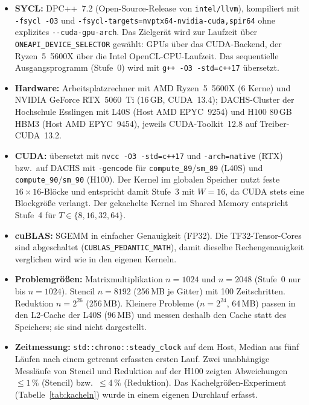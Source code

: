 \documentclass[12pt,a4paper]{article}
\begin{document}
\begin{itemize}[nosep]
    \item \textbf{SYCL:} DPC++~7.2 (Open-Source-Release von \texttt{intel/llvm}),
    kompiliert mit \texttt{-fsycl -O3} und
    \texttt{-fsycl-targets=\allowbreak nvptx64-\allowbreak nvidia-\allowbreak cuda,\allowbreak spir64}
    ohne explizites \texttt{-{}-cuda-\allowbreak gpu-\allowbreak arch}. Das Zielgerät wird zur Laufzeit
    über \texttt{ONEAPI\_\allowbreak DEVICE\_\allowbreak SELECTOR} gewählt: GPUs über das CUDA-Backend,
    der Ryzen~5~5600X über die Intel OpenCL-CPU-Laufzeit. Das sequentielle
    Ausgangsprogramm (Stufe~0) wird mit \texttt{g++ -O3 -std=c++17} übersetzt.
    \item \textbf{Hardware:} Arbeitsplatzrechner mit AMD Ryzen~5~5600X (6 Kerne)
    und NVIDIA GeForce RTX~5060~Ti (16\,GB, CUDA~13.4); DACHS-Cluster der
    Hochschule Esslingen mit L40S (Host AMD EPYC~9254) und
    H100 80\,GB HBM3 (Host AMD EPYC~9454), jeweils CUDA-Toolkit~12.8 auf
    Treiber-CUDA~13.2.
    \item \textbf{CUDA:} übersetzt mit \texttt{nvcc -O3 -std=c++17} und
    \texttt{-arch=native} (RTX) bzw.\ auf DACHS mit \texttt{-gencode} für
    \texttt{compute\_89}/\texttt{sm\_89} (L40S) und
    \texttt{compute\_90}/\texttt{sm\_90} (H100).
    Der Kernel im globalen Speicher nutzt feste $16 \times 16$-Blöcke
    und entspricht damit Stufe~3 mit $W = 16$, da CUDA stets eine Blockgröße
    verlangt. Der gekachelte Kernel im Shared Memory entspricht Stufe~4 für
    $T \in \{8, 16, 32, 64\}$.
    \item \textbf{cuBLAS:} SGEMM in einfacher Genauigkeit (FP32). Die
    TF32-Tensor-Cores sind abgeschaltet
    (\texttt{CUBLAS\_\allowbreak PEDANTIC\_\allowbreak MATH}), damit dieselbe
    Rechengenauigkeit verglichen wird wie in den eigenen Kerneln.
    \item \textbf{Problemgrößen:} Matrixmultiplikation $n = 1024$ und $n = 2048$
    (Stufe~0 nur bis $n = 1024$). Stencil $n = 8192$ (256\,MB je Gitter) mit
    100 Zeitschritten. Reduktion $n = 2^{26}$ (256\,MB). Kleinere Probleme
    ($n = 2^{24}$, 64\,MB) passen in den L2-Cache der L40S (96\,MB) und messen
    deshalb den Cache statt des Speichers; sie sind nicht dargestellt.
    \item \textbf{Zeitmessung:} \texttt{std::chrono::steady\_clock} auf dem Host,
    Median aus fünf Läufen nach einem getrennt erfassten ersten Lauf. Zwei
    unabhängige Messläufe von Stencil und Reduktion auf der H100 zeigten
    Abweichungen $\le 1\,\%$ (Stencil) bzw.\ $\le 4\,\%$ (Reduktion). Das
    Kachelgrößen-Experiment (Tabelle~\ref{tab:kacheln}) wurde in einem eigenen
    Durchlauf erfasst.
\end{itemize}
\end{document}
